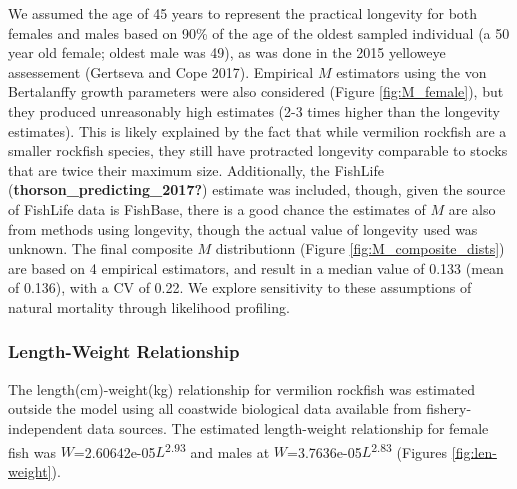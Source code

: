 \documentclass[11pt,
  english,
  a4paper,
]{article}
\begin{document}
We assumed the age of 45 years to represent the practical longevity for both females and males based on 90\% of the age of the oldest sampled individual (a 50 year old female; oldest male was 49), as was done in the 2015 yelloweye assessement {(Gertseva and Cope 2017)\leavevmode\tagmcend\tagstructend}. Empirical {\(M\)\leavevmode\tagmcend\tagstructend} estimators using the von Bertalanffy growth parameters were also considered (Figure \ref{fig:M_female}), but they produced unreasonably high estimates (2-3 times higher than the longevity estimates). This is likely explained by the fact that while vermilion rockfish are a smaller rockfish species, they still have protracted longevity comparable to stocks that are twice their maximum size. Additionally, the FishLife {(\textbf{thorson\_predicting\_2017?})\leavevmode\tagmcend\tagstructend} estimate was included, though, given the source of FishLife data is FishBase, there is a good chance the estimates of {\(M\)\leavevmode\tagmcend\tagstructend} are also from methods using longevity, though the actual value of longevity used was unknown. The final composite {\(M\)\leavevmode\tagmcend\tagstructend} distributionn (Figure \ref{fig:M_composite_dists}) are based on 4 empirical estimators, and result in a median value of 0.133 (mean of 0.136), with a CV of 0.22. We explore sensitivity to these assumptions of natural mortality through likelihood profiling.

\leavevmode\tagmcend\tagstructend\par


\hypertarget{length-weight-relationship}{%
\subsubsection{Length-Weight Relationship}\label{length-weight-relationship}}

\leavevmode\tagmcend\tagstructend


The length(cm)-weight(kg) relationship for vermilion rockfish was estimated outside the model using all coastwide biological data available from fishery-independent data sources. The estimated length-weight relationship for female fish was {\(W\)\leavevmode\tagmcend\tagstructend}=2.60642e-05{\(L\)\leavevmode\tagmcend\tagstructend}\textsuperscript{2.93} and males at {\(W\)\leavevmode\tagmcend\tagstructend}=3.7636e-05{\(L\)\leavevmode\tagmcend\tagstructend}\textsuperscript{2.83} (Figures \ref{fig:len-weight}).
\end{document}
